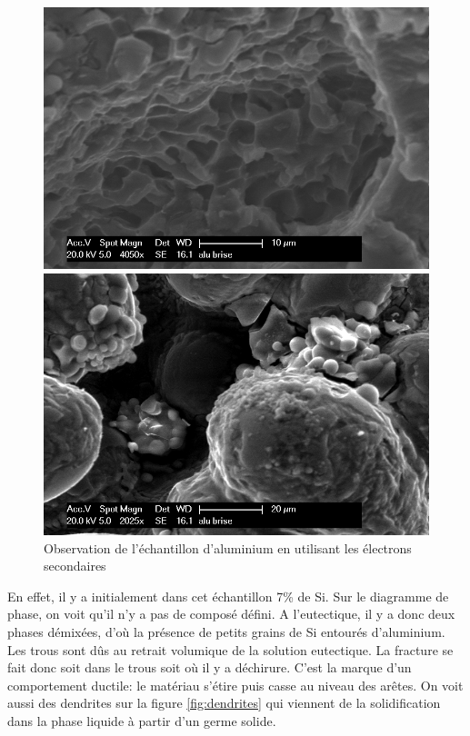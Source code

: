 \documentclass[a4paper,12pt]{article}
\begin{document}
\begin{figure}[h]
\begin{minipage}[c]{.55\linewidth}
\centering
\includegraphics[width=1\textwidth]{images/alu_arretes.png}
 \end{minipage}\hfill
\begin{minipage}[c]{.55\linewidth}
\centering
\includegraphics[width=1\textwidth]{images/alu_brise.png}
\end{minipage}
\caption{Observation de l'échantillon d'aluminium en utilisant les électrons secondaires}
\label{fig:alu_reliefs}
\end{figure}


En effet, il y a initialement dans cet échantillon 7\% de Si. Sur le diagramme de phase, on voit qu'il n'y a pas de composé défini. A l'eutectique, il y a donc deux phases démixées, d'où la présence de petits grains de Si entourés d'aluminium. Les trous sont dûs au retrait volumique de la solution eutectique. La fracture se fait donc soit dans le trous soit où il y a déchirure. C'est la marque d'un comportement ductile: le matériau s'étire puis casse au niveau des arêtes. On voit aussi des dendrites sur la figure \ref{fig:dendrites} qui viennent de la solidification dans la phase liquide à partir d'un germe solide.
\end{document}
